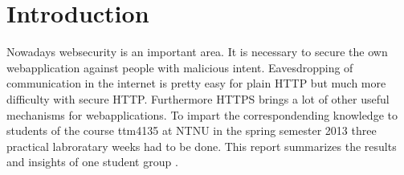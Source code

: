 \section {Introduction}
Nowadays websecurity is an important area. It is necessary to secure the own webapplication against people with malicious intent. Eavesdropping of communication in the internet is pretty easy for plain HTTP but much more difficulty with secure HTTP.  Furthermore HTTPS brings a lot of other useful mechanisms for webapplications. 
To impart the correspondending knowledge to students of the course ttm4135 at NTNU in the spring semester 2013 three practical labroratary weeks had to be done. This report summarizes the results and insights of one student group .
